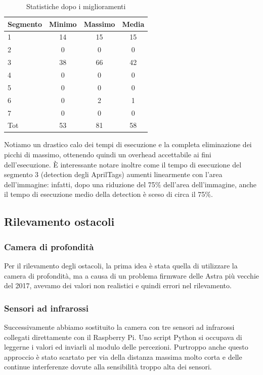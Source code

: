 \documentclass[]{article}
\begin{document}
\begin{table}[H]
    \centering
    \begin{tabular}{lccc}
        \toprule
        Segmento & Minimo & Massimo & Media \\
        \midrule
        1        & 14     & 15      & 15    \\
        2        & 0      & 0       & 0     \\
        3        & 38     & 66      & 42    \\
        4        & 0      & 0       & 0     \\
        5        & 0      & 0       & 0     \\
        6        & 0      & 2       & 1     \\
        7        & 0      & 0       & 0     \\
        \midrule
        Tot      & 53     & 81      & 58    \\
        \bottomrule
    \end{tabular}
    \caption{Statistiche dopo i miglioramenti}
\end{table}

Notiamo un drastico calo dei tempi di esecuzione e la completa eliminazione dei picchi di massimo, ottenendo quindi un overhead accettabile ai fini dell'esecuzione. È interessante notare inoltre come il tempo di esecuzione del segmento 3 (detection degli AprilTags) aumenti linearmente con l'area dell'immagine: infatti, dopo una riduzione del 75\% dell'area dell'immagine, anche il tempo di esecuzione medio della detection è sceso di circa il 75\%.

\subsection{Rilevamento ostacoli}

\subsubsection{Camera di profondità}
Per il rilevamento degli ostacoli, la prima idea è stata quella di utilizzare la camera di profondità, ma a causa di un problema firmware delle Astra più vecchie del 2017, avevamo dei valori non realistici e quindi errori nel rilevamento.

\subsubsection{Sensori ad infrarossi}
Successivamente abbiamo sostituito la camera con tre sensori ad infrarossi collegati direttamente con il Raspberry Pi. Uno script Python si occupava di leggerne i valori
ed inviarli al modulo delle percezioni. Purtroppo anche questo approccio è stato scartato per via della distanza massima molto corta e delle continue interferenze
dovute alla sensibilità troppo alta dei sensori.
\end{document}
